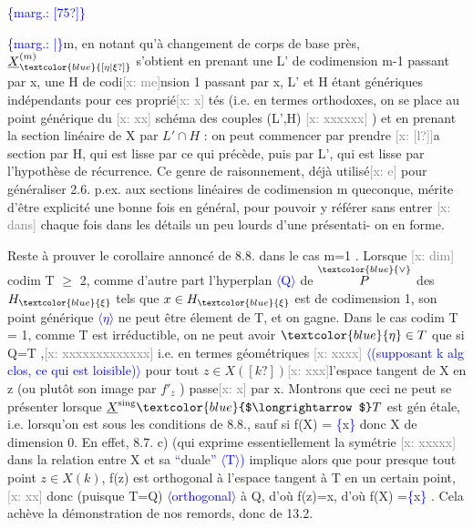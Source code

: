 \documentclass[11pt]{article}
\newcommand{\scanpage}[1]{\par\bigskip\noindent{\small\sffamily[scan #1]}\par}
\newcommand{\mspage}[1]{{\small\sffamily[p.\,#1]}}
\newcommand{\hand}[1]{\textcolor{blue}{#1}}
\newcommand{\inserted}[2][]{\textcolor{blue}{$\langle$#2$\rangle$}}
\newcommand{\margin}[1]{\textcolor{blue}{\{\textsf{marg.:} #1\}}}
\newcommand{\xout}[1]{\textcolor{gray}{[\textsf{x:} #1]}}
\newcommand{\unsure}[1]{[#1?]}
\begin{document}
\margin{\unsure{75}}

\clearpage
\scanpage{25/80}
\mspage{\hand{75}}

\margin{|}m, en notant qu'à changement de corps de base près, $\underline{X}^{(m)}_{\hand{\unsure{\eta|\xi}}}$ s'obtient en
prenant une L' de codimension m-1 passant par x, une H de codi\xout{me}nsion
1 passant par x, L' et H étant génériques indépendants pour ces proprié\xout{x}
tés (i.e. en termes orthodoxes, on se place au point générique du \xout{xx}
schéma des couples (L',H) \xout{xxxxxx} ) et en prenant la section linéaire
de X par $L'\cap H$ : on peut commencer par prendre \xout{\unsure{l}}a section par H, qui
est lisse par ce qui précède, puis par L', qui est lisse par l'hypothèse
de récurrence. Ce genre de raisonnement, déjà utilisé\xout{e} pour généraliser
2.6. p.ex. aux sections linéaires de codimension m queconque, mérite
d'être explicité une bonne fois en général, pour pouvoir y référer sans
entrer \xout{dans} chaque fois dans les détails un peu lourds d'une présentati-%
on en forme.

Reste à prouver le corollaire annoncé de 8.8. dans le cas m=1 .
Lorsque \xout{dim} codim T $\geqslant$ 2, comme d'autre part l'hyperplan \inserted{Q} de $\overset{\hand{\vee}}{P}$ des
$H_{\hand{\xi}}$ tels que $x\in H_{\hand{\xi}}$ est de codimension 1, son point générique \inserted{$\eta$} ne peut
être élement de T, et on gagne. Dans le cas codim T = 1, comme T est
irréductible, on ne peut avoir $\hand{\eta}\in T$ que si Q=T ,\xout{xxxxxxxxxxxxx}
i.e. en termes géométriques \xout{xxxx} \inserted[typed]{(supposant k alg clos, ce qui est loisible)} pour tout $z\in X(\unsure{k})$\xout{xxx}l'espace tangent
de X en z (ou plutôt son image par $f'_{z}$ ) passe\xout{x} par x. Montrons que
ceci ne peut se présenter lorsque $\underline{X}^{\mathrm{sing}}\hand{$\longrightarrow$}T$ est gén étale, i.e.
lorsqu'on est sous les conditions de 8.8., sauf si f(X) = \hand{\{}x\hand{\}} donc X
de dimension 0. En effet, 8.7. c) (qui exprime essentiellement la
symétrie \xout{xxxxx} dans la relation entre X et sa \hand{``}duale\hand{''} \inserted{T}\hand{)} implique alors que
pour presque tout point $z\in X(k)$, f(z) est orthogonal à l'espace tangent
à T en un certain point,\xout{xx} donc (puisque T=Q) \inserted{orthogonal} à Q, d'où f(z)=x, d'où
f(X) =\hand{\{}x\hand{\}} . Cela achève la démonstration de nos remords, donc de 13.2.
\end{document}
